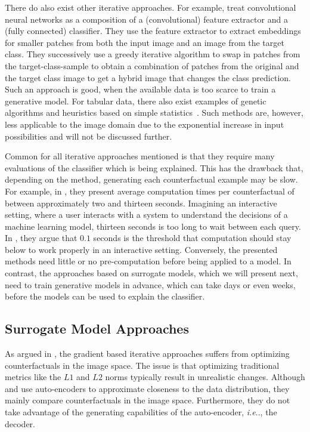 \documentclass[11pt,a4paper,twoside,openright,final]{memoir}
\makeatletter
\DeclareRobustCommand\onedot{\futurelet\@let@token\@onedot}
\def\@onedot{\ifx\@let@token.\else.\null\fi\xspace}
\def\ie{\emph{i.e}\onedot} \def\Ie{\emph{I.e}\onedot}
\makeatother
\begin{document}
There do also exist other iterative approaches.
For example, \citet{goyal19a} treat convolutional neural networks as a composition of a (convolutional) feature extractor and a (fully connected) classifier.
They use the feature extractor to extract embeddings for smaller patches from both the input image and an image from the target class. 
They successively use a greedy iterative algorithm to swap in patches from the target-class-sample to obtain a combination of patches from the original and the target class image to get a hybrid image that changes the class prediction.
Such an approach is good, when the available data is too scarce to train a generative model. 
For tabular data, there also exist examples of genetic algorithms \cite{Hashemi2020} and heuristics based on simple statistics~\cite{Gomez2020}.
Such methods are, however, less applicable to the image domain due to the exponential increase in input possibilities and will not be discussed further. 

Common for all iterative approaches mentioned is that they require many evaluations of the classifier which is being explained.
This has the drawback that, depending on the method, generating each counterfactual example may be slow.
For example, in \cite{VanLooveren2019}, they present average computation times per counterfactual of between approximately two and thirteen seconds.
Imagining an interactive setting, where a user interacts with a system to understand the decisions of a machine learning model, thirteen seconds is too long to wait between each query.
In \cite{card1991information}, they argue that $0.1$ seconds is the threshold that computation should stay below to work properly in an interactive setting.
Conversely, the presented methods need little or no pre-computation before being applied to a model.
In contrast, the approaches based on surrogate models, which we will present next, need to train generative models in advance, which can take days or even weeks, before the models can be used to explain the classifier.

\subsection{Surrogate Model Approaches} 

As argued in \cite{Rodriguez2021}, the gradient based iterative approaches suffers from optimizing counterfactuals in the image space.
The issue is that optimizing traditional metrics like the $L1$ and $L2$ norms typically result in unrealistic changes. 
Although \cite{Dhurandhar2018} and \cite{VanLooveren2019} use auto-encoders to approximate closeness to the data distribution, they mainly compare counterfactuals in the image space.
Furthermore, they do not take advantage of the generating capabilities of the auto-encoder, \ie, the decoder. 
\end{document}
